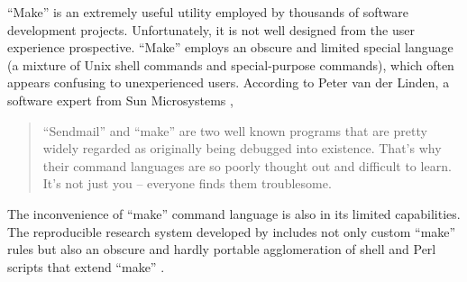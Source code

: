 ``Make'' is an extremely useful utility employed by thousands of
software development projects. Unfortunately, it is not
well designed from the user experience prospective. ``Make'' employs
an obscure and limited special language (a mixture of Unix shell
commands and special-purpose commands), which often appears confusing
to unexperienced users. According to Peter van der Linden, a software
expert from Sun Microsystems \cite[]{linden},
\begin{quote}
  ``Sendmail'' and ``make'' are two well known programs that are
  pretty widely regarded as originally being debugged into existence.
  That's why their command languages are so poorly thought out and
  difficult to learn. It's not just you -- everyone finds them
  troublesome.
\end{quote}
The inconvenience of ``make'' command language is also in its limited
capabilities.  The reproducible research system developed by
\cite{matt} includes not only custom ``make'' rules but also an
obscure and hardly portable agglomeration of shell and Perl scripts
that extend ``make'' \cite[]{Fomel.sep.94.matt3}.

